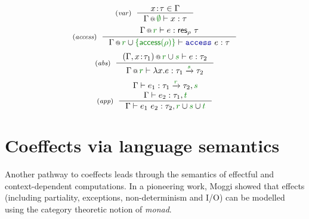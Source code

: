 \begin{figure}[t]
\begin{equation*}
\tyrule{var}
  {x\!:\!\tau \in \Gamma }
  {\coctx{\Gamma}{\cclrd{\emptyset}} \vdash x : \tau }
\end{equation*}
\begin{equation*}
\tyrule{access}
  {\coctx{\Gamma}{\cclrd{r}} \vdash e : \ident{res}_\rho~\tau }
  {\coctx{\Gamma}{\cclrd{r} \cup \cclrd{ \{\ident{access}(\rho)\} }} \vdash \kvd{access}~e : \tau }
\end{equation*}
\begin{equation*}
\tyrule{abs}
  {\coctx{(\Gamma, x\!:\!\tau_1)}{\cclrd{r} \cup \cclrd{s}} \vdash e : \tau_2 }
  {\coctx{\Gamma}{\cclrd{r}} \vdash \lambda x.e : \tau_1 \xrightarrow{\cclrd{s}} \tau_2}
\end{equation*}
\begin{equation*}
\tyrule{app}
  {\Gamma \vdash e_1 : \tau_1 \xrightarrow{\cclrd{r}} \tau_2, \cclrd{s} \\
   \Gamma \vdash e_2 : \tau_1, \cclrd{t} }
  {\Gamma \vdash e_1~e_2 : \tau_2, \cclrd{r}\cup\cclrd{s}\cup\cclrd{t}  }
\end{equation*}

\label{fig:path-coeff}
\end{figure}



%
%

\section{Coeffects via language semantics}
\label{sec:path-sem}

Another pathway to coeffects leads through the semantics of effectful and context-dependent
computations. In a pioneering work, Moggi \cite{monad-notions} showed that effects (including
partiality, exceptions, non-determinism and I/O) can be modelled using the category theoretic
notion of \emph{monad}.

